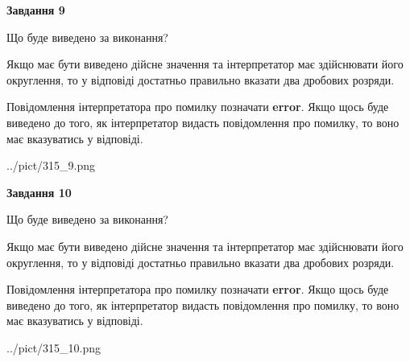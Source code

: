 \documentclass[12pt, ukrainian]{article}
\begin{document}
{\begin {Large}
{\begin {center}\textbf{Завдання 9}\end {center}}\par
Що буде виведено за виконання? \par

Якщо має бути виведено дійсне значення та інтерпретатор має здійснювати його округлення, 
то у відповіді достатньо правильно вказати два дробових розряди.

Повідомлення інтерпретатора про помилку позначати \textbf{error}.
Якщо щось буде виведено до того, як інтерпретатор видасть повідомлення про помилку, 
то воно має вказуватись у відповіді. \par

\begin{center}
	{../pict/315_9.png}
\end{center}
\newpage

{\begin {center}\textbf{Завдання 10}\end {center}}\par
Що буде виведено за виконання? \par

Якщо має бути виведено дійсне значення та інтерпретатор має здійснювати його округлення, 
то у відповіді достатньо правильно вказати два дробових розряди.

Повідомлення інтерпретатора про помилку позначати \textbf{error}.
Якщо щось буде виведено до того, як інтерпретатор видасть повідомлення про помилку, 
то воно має вказуватись у відповіді. \par

\begin{center}
	{../pict/315_10.png}
\end{center}
\newpage

\end {Large}}
\end{document}
